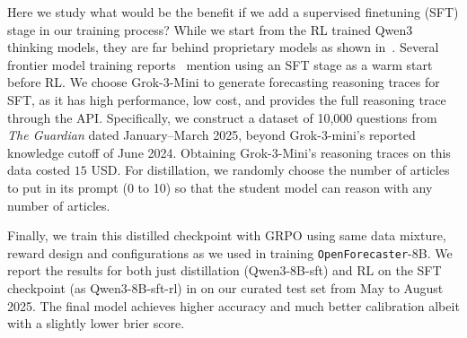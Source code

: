 \documentclass{article} %
\newcommand{\ourmodel}{\texttt{OpenForecaster}}
\begin{document}
\vspace{-.2cm}
Here we study what would be the benefit if we add a supervised finetuning (SFT) stage in our training process? While we start from the RL trained Qwen3 thinking models, they are far behind proprietary models as shown in~. Several frontier model training reports~\citep{guo2025deepseek} mention using an SFT stage as a warm start before RL. We choose Grok-3-Mini to generate forecasting reasoning traces for SFT, as it has high performance, low cost, and provides the full reasoning trace through the API. 
Specifically, we construct a dataset of 10,000 questions from \textit{The Guardian} dated January–March 2025, beyond Grok-3-mini's reported knowledge cutoff of June 2024. Obtaining Grok-3-Mini's reasoning traces on this data costed $15$ USD. For distillation, we randomly choose the number of articles to put in its prompt (0 to 10) so that the student model can reason with any number of articles.  %

Finally, we train this distilled checkpoint with GRPO using same data mixture, reward design and configurations as we used in training \ourmodel-8B. We report the results for both just distillation (Qwen3-8B-sft) and RL on the SFT checkpoint (as Qwen3-8B-sft-rl) in  on our curated test set from May to August 2025. The final model achieves higher accuracy and much better calibration albeit with a slightly lower brier score. 



\end{document}
